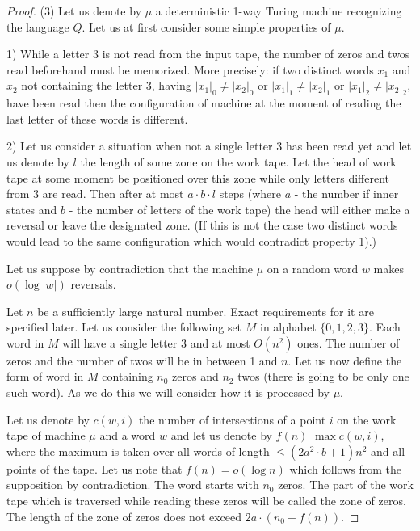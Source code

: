 \documentclass{llncs}
\begin{document}
\begin{proof}
\bigskip

(3) Let us denote by $\mu$ a deterministic 1-way Turing machine recognizing the language $Q$.
Let us at first consider some simple properties of $\mu$.

1) While a letter $3$ is not read from the input tape, the number of zeros and twos read beforehand must be memorized. More precisely: if two distinct words $x_1$ and $x_2$ not containing the letter $3$, having $|x_1|_0 \neq |x_2|_0$ or $|x_1|_1 \neq |x_2|_1$ or $|x_1|_2 \neq |x_2|_2$, have been read then the configuration of machine at the moment of reading the last letter of these words is different.

2) Let us consider a situation when not a single letter $3$ has been read yet and let us denote by $l$ the length of some zone on the work tape. Let the head of work tape at some moment be positioned over this zone while only letters different from $3$ are read. Then after at most $a\cdot b\cdot l$ steps (where $a$ - the number if inner states and $b$ - the number of letters of the work tape) the head will either make a reversal or leave the designated zone. (If this is not the case two distinct words would lead to the same configuration which would contradict property 1).)

Let us suppose by contradiction that the machine $\mu$ on a random word $w$ makes $o(\log |w|)$ reversals.

Let $n$ be a sufficiently large natural number. Exact requirements for it are specified later. Let us consider the following set $M$ in alphabet $\{0, 1, 2, 3\}$. Each word in $M$ will have a single letter $3$ and at most $O(n^2)$ ones. The number of zeros and the number of twos will be in between 1 and $n$. Let us now define the form of word in $M$ containing $n_0$ zeros and $n_2$ twos (there is going to be only one such word). As we do this we will consider how it is processed by $\mu$.

Let us denote by $c(w, i)$ the number of intersections of a point $i$ on the work tape of machine $\mu$ and a word $w$ and let us denote by $f(n)$ $\max c(w, i)$, where the maximum is taken over all words of length $\leq (2a^2\cdot b+1)n^2$ and all points of the tape. Let us note that $f(n)=o(\log n)$ which follows from the supposition by contradiction. %
The word starts with $n_0$ zeros. The part of the work tape which is traversed while reading these zeros will be called the zone of zeros. The length of the zone of zeros does not exceed $2a\cdot (n_0+f(n))$.


\end{proof}
\end{document}

